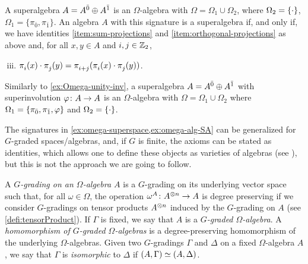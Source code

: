 \begin{ex}\label{ex:omega-alg-SA}
	A superalgebra $A = A^{\bar0} \oplus A^{\bar1}$ is an $\Omega$-algebra with $\Omega = \Omega_1 \cup \Omega_2$, where $\Omega_2 = \{ \cdot \}$, $\Omega_1 = \{ \pi_{\bar 0}, \pi_{\bar 1} \}$.
	An algebra $A$ with this signature is a superalgebra if, and only if, we have identities \eqref{item:sum-projections} and \eqref{item:orthogonal-projections} as above and, for all $x,y\in A$ and $i, j\in \mathbb{Z}_2$,
	\begin{enumerate}[(i)]
        \setcounter{enumi}{2}
		\item $\pi_i^{} (x) \cdot \pi_j^{} (y) = \pi_{i+j}^{}( \pi_i^{} (x) \cdot \pi_j^{} (y) )$.
	\end{enumerate}
\end{ex}

\begin{ex}\label{ex:omega-alg-SA-sinv}
    Similarly to \cref{ex:Omega-unity-inv}, a superalgebra $A = A^{\bar0} \oplus A^{\bar1}$ with superinvolution $\varphi\colon A \to A$ is an  $\Omega$-algebra with $\Omega = \Omega_1 \cup \Omega_2$ where $\Omega_1 = \{\pi_{\bar 0}, \pi_{\bar 1}, \varphi \}$ and  $\Omega_2 = \{ \cdot \}$.
\end{ex}

\begin{remark}
    The signatures in \cref{ex:omega-superspace,ex:omega-alg-SA} can be generalized for $G$-graded spaces/algebras, and, if $G$ is finite, the axioms can be stated as identities, which allows one to define these objects as varieties of algebras (see \cite[Section 2]{MR3886336}), but this is not the approach we are going to follow. 
\end{remark}

\begin{defi}\label{def:grds-on-Omega-algebras}
	A \emph{$G$-grading on an $\Omega$-algebra $A$} is a $G$-grading on its underlying vector space such that, for all $\omega \in \Omega$, the operation $\omega^A\colon A^{\otimes n} \to A$ is degree preserving if we consider $G$-gradings on tensor products $A^{\otimes n}$ induced by the $G$-grading on $A$ (see \cref{defi:tensorProduct}). 
	If $\Gamma$ is fixed, we say that $A$ is a \emph{$G$-graded $\Omega$-algebra}. 
	A \emph{homomorphism of $G$-graded $\Omega$-algebras} is a degree-preserving homomorphism of the underlying $\Omega$-algebras. 
	Given two $G$-gradings $\Gamma$ and $\Delta$ on a fixed $\Omega$-algebra $A$, we say that $\Gamma$ is \emph{isomorphic} to $\Delta$ if $(A, \Gamma) \simeq (A, \Delta)$.  
\end{defi}

